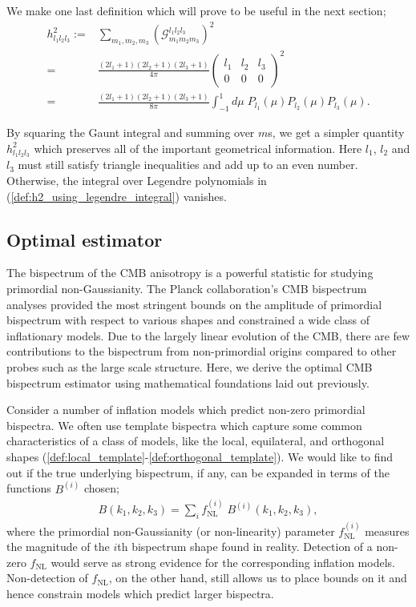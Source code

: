 We make one last definition which will prove to be useful in the next section;
\begin{align}
	h^2_{l_1 l_2 l_3} :=& \sum_{m_1, m_2, m_3} \left( \mathcal{G}^{l_1 l_2 l_3}_{m_1 m_2 m_3} \right)^2  \label{def:h2_using_gaunt_integral}\\
	=& \frac{(2l_1+1)(2l_2+1)(2l_3+1)}{4\pi} { \begin{pmatrix}	l_1 & l_2 & l_3 \\ 0 & 0 & 0 \end{pmatrix} }^2 \\
	=& \frac{(2l_1+1)(2l_2+1)(2l_3+1)}{8\pi} \int_{-1}^{1} d\mu \; P_{l_1}(\mu) P_{l_2}(\mu) P_{l_3}(\mu). \label{def:h2_using_legendre_integral}
\end{align}

By squaring the Gaunt integral and summing over $m$s, we get a simpler quantity $h^2_{l_1 l_2 l_3}$ which preserves all of the important geometrical information. Here $l_1$, $l_2$ and $l_3$ must still satisfy triangle inequalities and add up to an even number. Otherwise, the integral over Legendre polynomials in (\ref{def:h2_using_legendre_integral}) vanishes.

\subsection{Optimal estimator}
The bispectrum of the CMB anisotropy is a powerful statistic for studying primordial non-Gaussianity. The Planck collaboration's CMB bispectrum analyses provided the most stringent bounds on the amplitude of primordial bispectrum with respect to various shapes and constrained a wide class of inflationary models. Due to the largely linear evolution of the CMB, there are few contributions to the bispectrum from non-primordial origins compared to other probes such as the large scale structure. Here, we derive the optimal CMB bispectrum estimator using mathematical foundations laid out previously.

Consider a number of inflation models which predict non-zero primordial bispectra. We often use template bispectra which capture some common characteristics of a class of models, like the local, equilateral, and orthogonal shapes (\ref{def:local_template}-\ref{def:orthogonal_template}). We would like to find out if the true underlying bispectrum, if any, can be expanded in terms of the functions $B^{(i)}$ chosen;
\begin{align}
	B(k_1,k_2,k_3) = \sum_i f_\text{NL}^{(i)} \; B^{(i)}(k_1,k_2,k_3), \label{eqn:primordial_bispectrum_fNLs}
\end{align}
where the primordial non-Gaussianity (or non-linearity) parameter $f^{(i)}_\text{NL}$ measures the magnitude of the $i$th bispectrum shape found in reality. Detection of a non-zero $f_\text{NL}$ would serve as strong evidence for the corresponding inflation models. Non-detection of $f_\text{NL}$, on the other hand, still allows us to place bounds on it and hence constrain models which predict larger bispectra.

